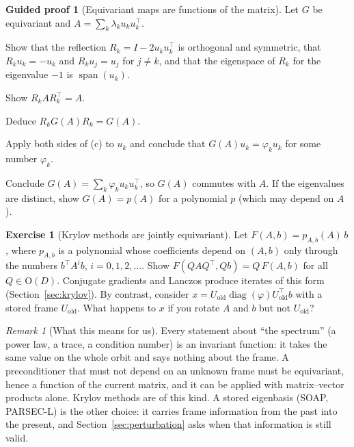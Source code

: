 \documentclass[11pt,a4paper]{article}
\newcommand{\Orth}{\mathrm{O}}
\DeclareMathOperator{\diag}{diag}
\DeclareMathOperator{\spn}{span}
\theoremstyle{plain}
\theoremstyle{definition}
\newtheorem{exercise}[proposition]{Exercise}
\newtheorem{guided}[proposition]{Guided proof}
\theoremstyle{remark}
\newtheorem{remark}[proposition]{Remark}
\begin{document}
\begin{guided}[Equivariant maps are functions of the matrix]\label{gp:equivariant}
Let $G$ be equivariant and $A=\sum_k\lambda_ku_ku_k^\top$.
\begin{steps}
\item Show that the reflection $R_k=I-2u_ku_k^\top$ is orthogonal and symmetric, that $R_ku_k=-u_k$ and $R_ku_j=u_j$
  for $j\ne k$, and that the eigenspace of $R_k$ for the eigenvalue $-1$ is $\spn(u_k)$.
\item Show $R_kAR_k^\top=A$.
\item Deduce $R_kG(A)R_k=G(A)$.
\item Apply both sides of (c) to $u_k$ and conclude that $G(A)u_k=\varphi_ku_k$ for some number $\varphi_k$.
\item Conclude $G(A)=\sum_k\varphi_ku_ku_k^\top$, so $G(A)$ commutes with $A$. If the eigenvalues are distinct, show
  $G(A)=p(A)$ for a polynomial $p$ (which may depend on $A$).
\end{steps}
\end{guided}

\begin{exercise}[Krylov methods are jointly equivariant]\label{ex:krylovequiv}
Let $F(A,b)=p_{A,b}(A)\,b$, where $p_{A,b}$ is a polynomial whose coefficients depend on $(A,b)$ only through the
numbers $b^\top A^ib$, $i=0,1,2,\dots$. Show $F(QAQ^\top,Qb)=Q\,F(A,b)$ for all $Q\in\Orth(D)$. Conjugate gradients
and Lanczos produce iterates of this form (Section~\ref{sec:krylov}). By contrast, consider
$x=U_{\mathrm{old}}\diag(\varphi)U_{\mathrm{old}}^\top b$ with a stored frame $U_{\mathrm{old}}$. What happens to $x$
if you rotate $A$ and $b$ but not $U_{\mathrm{old}}$?
\end{exercise}

\begin{remark}[What this means for us]\label{rem:invariance}
Every statement about ``the spectrum'' (a power law, a trace, a condition number) is an invariant function: it takes
the same value on the whole orbit and says nothing about the frame. A preconditioner that must not depend on an
unknown frame must be equivariant, hence a function of the current matrix, and it can be applied with matrix--vector
products alone. Krylov methods are of this kind. A stored eigenbasis (SOAP, PARSEC-L) is the other choice: it carries
frame information from the past into the present, and Section~\ref{sec:perturbation} asks when that information is
still valid.
\end{remark}
\end{document}
